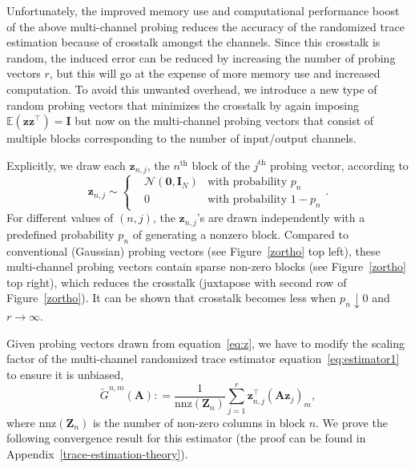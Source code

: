 \documentclass[10pt]{article}
\def\eqref#1{equation~\ref{#1}}
\newcommand{\B}{\mathbf}
\begin{document}
Unfortunately, the improved memory use and computational performance boost of the above multi-channel probing reduces the accuracy of the randomized trace estimation because of crosstalk amongst the channels. Since this crosstalk is random, the induced error can be reduced by increasing the number of probing vectors $r$, but this will go at the expense of more memory use and increased computation. To avoid this unwanted overhead, we introduce a new type of random probing vectors that minimizes the crosstalk by again imposing $\mathbb{E}(\B{zz}^\top)=\B{I}$ but now on the multi-channel probing vectors that consist of multiple blocks corresponding to the number of input/output channels.

Explicitly, we draw each $\B{z}_{n,j}$, the $n^{\textrm{th}}$ block of the $j^{\textrm{th}}$ probing vector, according to
\begin{equation}\label{eq:z}
\B{z}_{n,j} \sim \left\{\begin{aligned}&\mathcal{N}(\B{0},\B{I}_{N}) & \textrm{with probability } p_n \\ & 0  &\textrm{with probability } 1-p_n \end{aligned} \right..
\end{equation}
For different values of $(n,j)$, the $\B{z}_{n,j}$'s are drawn independently with a predefined probability $p_n$ of generating a nonzero block. Compared to conventional (Gaussian) probing vectors (see Figure~\ref{zortho} top left), these multi-channel probing vectors contain sparse non-zero blocks (see Figure~\ref{zortho} top right), which reduces the crosstalk (juxtapose with second row of Figure~\ref{zortho}). It can be shown that crosstalk becomes less when $p_n\downarrow 0$ and $r\rightarrow\infty$.

Given probing vectors drawn from \eqref{eq:z}, we have to modify the scaling factor of the multi-channel randomized trace estimator \eqref{eq:estimator1} to ensure it is unbiased,
\begin{equation}\label{eq:estimator}
  \widetilde{G}^{n, m}(\B{A}) : = \frac{1}{\textrm{nnz}(\B{Z}_n)} \sum_{j=1}^r \B{z}_{n,j}^{\top} \left(\B{A} \B{z}_j\right)_m,
\end{equation}
where $\textrm{nnz}(\B{Z}_n)$ is the number of non-zero columns in block $n$. We prove the following convergence result for this estimator (the proof can be found in Appendix~\ref{trace-estimation-theory}).
\end{document}
